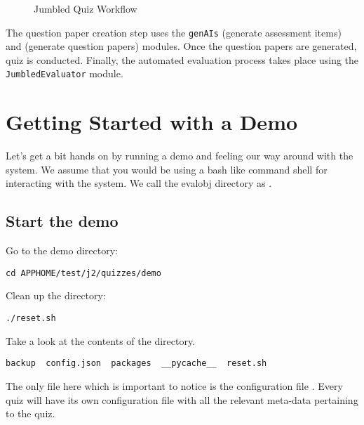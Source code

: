 \documentclass[12pt]{report}
\makeatletter
\newcommand{\kctt}[1]{{\color{Red}{\lstinline[basicstyle=\ttfamily, mathescape=true]@#1@}}}
\makeatother
\begin{document}
\begin{figure}[H]
\begin{center}
{
}
\end{center}
\caption{Jumbled Quiz Workflow}
\label{f:jquiz}
\end{figure}
The question paper creation step uses the \lstinline[style=pc]@genAIs@ (generate assessment items) and \lstinline@genQPs@ (generate question papers) modules. Once the question papers are generated, quiz is conducted. Finally, the automated evaluation process takes place using the \lstinline[style=pc]@JumbledEvaluator@ module.

\section{Getting Started with a Demo}
Let's get a bit hands on by running a demo and feeling our way around with the system. We assume that you would be using a bash like command shell for interacting with the system. We call the evalobj directory as \kctt{APPHOME}.
\subsection{Start the demo}

Go to the demo directory:
\begin{lstlisting}[style=oc]
cd APPHOME/test/j2/quizzes/demo
\end{lstlisting}


Clean up the directory:
\begin{lstlisting}[style=oc]
./reset.sh
\end{lstlisting}

Take a look at the contents of the directory.
\begin{lstlisting}[style=oc]
backup  config.json  packages  __pycache__  reset.sh
\end{lstlisting}

The only file here which is important to notice is the configuration file \kctt{config.json}. Every quiz will have its own configuration file with all the relevant meta-data pertaining to the quiz.
\end{document}
